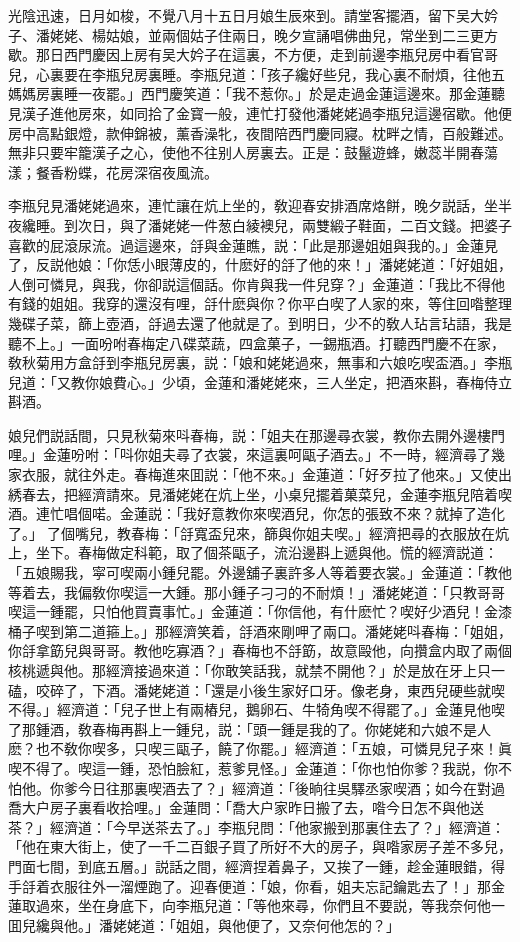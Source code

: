 光陰迅速，日月如梭，不覺八月十五日月娘生辰來到。請堂客擺酒，留下吴大妗子、潘姥姥、楊姑娘，並兩個姑子住兩日，晚夕宣誦唱佛曲兒，常坐到二三更方歇。那日西門慶因上房有吴大妗子在這裏，不方便，走到前邊李瓶兒房中看官哥兒，心裏要在李瓶兒房裏睡。李瓶兒道：「孩子纔好些兒，我心裏不耐煩，往他五媽媽房裏睡一夜罷。」西門慶笑道：「我不惹你。」於是走過金蓮這邊來。那金蓮聽見漢子進他房來，如同拾了金寳一般，連忙打發他潘姥姥過李瓶兒這邊宿歇。他便房中高點銀燈，款伸錦被，薰香澡牝，夜間陪西門慶同寢。枕畔之情，百般難述。無非只要牢籠漢子之心，使他不往别人房裏去。正是：鼓鬣遊蜂，嫩蕊半開春蕩漾；餐香粉蝶，花房深宿夜風流。

李瓶兒見潘姥姥過來，連忙讓在炕上坐的，敎迎春安排酒席烙餅，晚夕説話，坐半夜纔睡。到次日，與了潘姥姥一件葱白綾襖兒，兩雙緞子鞋面，二百文錢。把婆子喜歡的屁滾尿流。過這邊來，㧱與金蓮瞧，説：「此是那邊姐姐與我的。」金蓮見了，反説他娘：「你恁小眼薄皮的，什麽好的㧱了他的來！」潘姥姥道：「好姐姐，人倒可憐見，與我，你卻説這個話。你肯與我一件兒穿？」金蓮道：「我比不得他有錢的姐姐。我穿的還沒有哩，㧱什麽與你？你平白喫了人家的來，等住回喒整理幾碟子菜，篩上壺酒，㧱過去還了他就是了。到明日，少不的敎人玷言玷語，我是聽不上。」一面吩咐春梅定八碟菜蔬，四盒菓子，一錫瓶酒。打聽西門慶不在家，敎秋菊用方盒㧱到李瓶兒房裏，説：「娘和姥姥過來，無事和六娘吃喫盃酒。」李瓶兒道：「又教你娘費心。」少頃，金蓮和潘姥姥來，三人坐定，把酒來斟，春梅侍立斟酒。

娘兒們説話間，只見秋菊來呌春梅，説：「姐夫在那邊尋衣裳，教你去開外邊樓門哩。」金蓮吩咐：「呌你姐夫尋了衣裳，來這裏呵甌子酒去。」不一時，經濟尋了幾家衣服，就往外走。春梅進來囬説：「他不來。」金蓮道：「好歹拉了他來。」又使出綉春去，把經濟請來。見潘姥姥在炕上坐，小桌兒擺着菓菜兒，金蓮李瓶兒陪着喫酒。連忙唱個喏。金蓮説：「我好意教你來喫酒兒，你怎的張致不來？就掉了造化了。」𢫓了個嘴兒，教春梅：「㧱寬盃兒來，篩與你姐夫喫。」經濟把尋的衣服放在炕上，坐下。春梅做定科範，取了個茶甌子，流沿邊斟上遞與他。慌的經濟説道：「五娘賜我，寜可喫兩小鍾兒罷。外邊舖子裏許多人等着要衣裳。」金蓮道：「教他等着去，我偏敎你喫這一大鍾。那小鍾子刁刁的不耐煩！」潘姥姥道：「只教哥哥喫這一鍾罷，只怕他買賣事忙。」金蓮道：「你信他，有什麽忙？喫好少酒兒！金漆桶子喫到第二道箍上。」那經濟笑着，㧱酒來剛呷了兩口。潘姥姥呌春梅：「姐姐，你㧱拿筯兒與哥哥。教他吃寡酒？」春梅也不㧱筯，故意毆他，向攢盒内取了兩個核桃遞與他。那經濟接過來道：「你敢笑話我，就禁不開他？」於是放在牙上只一磕，咬碎了，下酒。潘姥姥道：「還是小後生家好口牙。像老身，東西兒硬些就喫不得。」經濟道：「兒子世上有兩樁兒，鵝卵石、牛犄角喫不得罷了。」金蓮見他喫了那鍾酒，敎春梅再斟上一鍾兒，説：「頭一鍾是我的了。你姥姥和六娘不是人麽？也不敎你喫多，只喫三甌子，饒了你罷。」經濟道：「五娘，可憐見兒子來！眞喫不得了。喫這一鍾，恐怕臉紅，惹爹見怪。」金蓮道：「你也怕你爹？我説，你不怕他。你爹今日往那裏喫酒去了？」經濟道：「後晌往吳驛丞家喫酒；如今在對過喬大户房子裏看收拾哩。」金蓮問：「喬大户家昨日搬了去，喒今日怎不與他送茶？」經濟道：「今早送茶去了。」李瓶兒問：「他家搬到那裏住去了？」經濟道：「他在東大街上，使了一千二百銀子買了所好不大的房子，與喒家房子差不多兒，門面七間，到底五層。」説話之間，經濟捏着鼻子，又挨了一鍾，趁金蓮眼錯，得手㧱着衣服往外一溜煙跑了。迎春便道：「娘，你看，姐夫忘記鑰匙去了！」那金蓮取過來，坐在身底下，向李瓶兒道：「等他來尋，你們且不要説，等我奈何他一囬兒纔與他。」潘姥姥道：「姐姐，與他便了，又奈何他怎的？」

